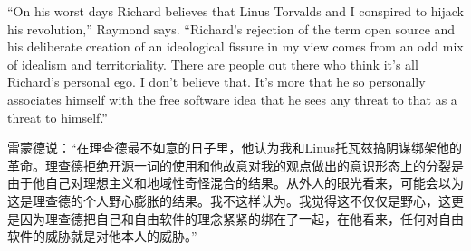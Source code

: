 



\ifdefined\eng
``On his worst days Richard believes that Linus Torvalds and I conspired to hijack his revolution,'' Raymond says. ``Richard's rejection of the term open source and his deliberate creation of an ideological fissure in my view comes from an odd mix of idealism and territoriality. There are people out there who think it's all Richard's personal ego. I don't believe that. It's more that he so personally associates himself with the free software idea that he sees any threat to that as a threat to himself.''
\fi

\ifdefined\chs
雷蒙德说：``在理查德最不如意的日子里，他认为我和Linus托瓦兹搞阴谋绑架他的革命。理查德拒绝开源一词的使用和他故意对我的观点做出的意识形态上的分裂是由于他自己对理想主义和地域性奇怪混合的结果。从外人的眼光看来，可能会以为这是理查德的个人野心膨胀的结果。我不这样认为。我觉得这不仅仅是野心，这更是因为理查德把自己和自由软件的理念紧紧的绑在了一起，在他看来，任何对自由软件的威胁就是对他本人的威胁。''
\fi

